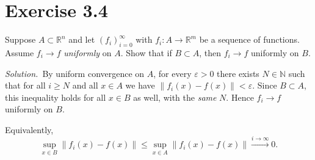 \documentclass[11pt,a4paper]{article}
\newenvironment{solution}{\par\noindent\textit{Solution.}\ }{\par\vspace{0.5em}}
\begin{document}
\section*{Exercise 3.4}
Suppose $A\subset\mathbb{R}^n$ and let $(f_i)_{i=0}^\infty$ with $f_i:A\to\mathbb{R}^m$ be a sequence of functions.
Assume $f_i\to f$ \emph{uniformly} on $A$. Show that if $B\subset A$, then $f_i\to f$ uniformly on $B$.

\begin{solution}By uniform convergence on $A$, for every $\varepsilon>0$ there exists $N\in\mathbb{N}$ such that
for all $i\ge N$ and all $x\in A$ we have $\|f_i(x)-f(x)\|<\varepsilon$. Since $B\subset A$, this inequality holds
for all $x\in B$ as well, with the \emph{same} $N$. Hence $f_i\to f$ uniformly on $B$. \end{solution}\medskip Equivalently,
\[
\sup_{x\in B}\|f_i(x)-f(x)\|\le \sup_{x\in A}\|f_i(x)-f(x)\|\xrightarrow{i\to\infty} 0.
\]
\end{document}
